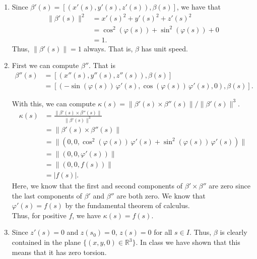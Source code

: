 \documentclass[12 pt, letterpaper]{hmcpset}
\begin{document}
\begin{solution}
	\begin{enumerate}
		\item Since $\beta'(s) = [(x'(s), y'(s), z'(s)), \beta(s)]$, we have that
			\[
				\begin{split}
					\lVert \beta'(s) \rVert^{2} & = x'(s)^{2} + y'(s)^{2} + z'(s)^{2} \\
								    & = \cos^{2}{(\varphi(s))} + \sin^{2}{(\varphi(s))} + 0 \\
								    & = 1.
				\end{split}
			\]
			Thus, $\lVert \beta'(s) \rVert = 1$ always. That is, $\beta$ has unit speed.
		\item First we can compute $\beta''$. That is
			\[
				\begin{split}
					\beta''(s) & = [(x''(s), y''(s), z''(s)), \beta(s)] \\
						   & = [(-\sin{(\varphi(s))} \, \varphi'(s), \cos{(\varphi(s))} \, \varphi'(s),  0), \beta(s)].
				\end{split}
			\]
			
			With this, we can compute $\kappa(s) = \lVert \beta'(s) \times \beta''(s) \rVert/\lVert \beta'(s) \rVert^{3}$.
			\[
				\begin{split}
					\kappa(s) & = \frac{\lVert \beta'(s) \times \beta''(s) \rVert}{\lVert \beta'(s) \rVert^{3}} \\
						  & = \lVert \beta'(s) \times \beta''(s) \rVert \\
						  & = \lVert (0, 0, \cos^{2}{(\varphi(s))} \, \varphi'(s) + \sin^{2}{(\varphi(s))} \, \varphi'(s)) \rVert \\
						  & = \lVert (0, 0, \varphi'(s)) \rVert \\
						  & = \lVert (0, 0, f(s)) \rVert \\
						  & = \lvert f(s) \rvert.
				\end{split}
			\]
			Here, we know that the first and second components of $\beta' \times \beta''$ are zero since the last components of $\beta'$ and $\beta''$ are both zero. We know that $\varphi'(s) = f(s)$ by the fundamental theorem of calculus. \\

			Thus, for positive $f$, we have $\kappa(s) = f(s)$.
		\item Since $z'(s) = 0$ and $z(s_{0}) = 0$, $z(s) = 0$ for all $s \in I$. Thus, $\beta$ is clearly contained in the plane $\{ (x, y, 0) \in \mathbb{R}^{3} \}$. In class we have shown that this means that it has zero torsion.
	\end{enumerate}
\end{solution}
\end{document}
